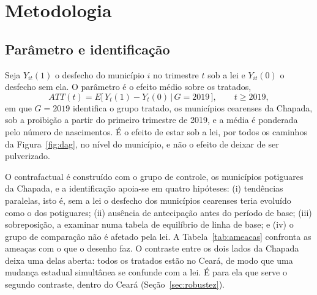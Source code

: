 \chapter{Metodologia}
\label{sec:avaliacao}

\section{Parâmetro e identificação}
\label{sec:parametro}

Seja $Y_{it}(1)$ o desfecho do município $i$ no trimestre $t$ sob a lei e
$Y_{it}(0)$ o desfecho sem ela. O parâmetro é o efeito médio sobre os tratados,
\[
ATT(t) = E\big[\,Y_{t}(1) - Y_{t}(0) \,\big|\, G = 2019\,\big], \qquad t \geq 2019,
\]
em que $G = 2019$ identifica o grupo tratado, os municípios cearenses da
Chapada, sob a proibição a partir do primeiro trimestre de 2019, e a média é ponderada pelo número de
nascimentos. É o efeito de
estar sob a lei, por todos os caminhos da Figura~\ref{fig:dag}, no nível do
município, e não o efeito de deixar de ser pulverizado.

O contrafactual é construído com o grupo de controle, os municípios potiguares
da Chapada, e a
identificação apoia-se em quatro hipóteses: (i) tendências paralelas, isto é,
sem a lei o desfecho dos municípios cearenses teria evoluído como o dos
potiguares; (ii) ausência de antecipação antes do período de base; (iii)
sobreposição, a examinar numa tabela de equilíbrio de linha de base; e (iv) o
grupo de comparação não é afetado pela lei. A Tabela~\ref{tab:ameacas}
confronta as ameaças com o que o desenho faz. O contraste entre os dois lados
da Chapada deixa uma delas aberta: todos os tratados estão no Ceará, de modo
que uma mudança estadual simultânea se confunde com a lei. É para ela que serve
o segundo contraste, dentro do Ceará (Seção~\ref{sec:robustez}).


